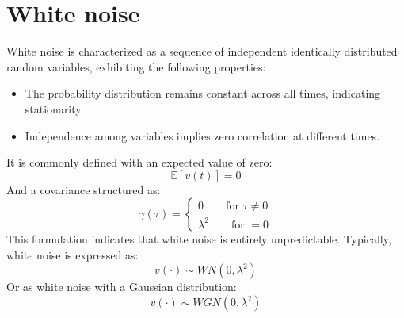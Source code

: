 \section{White noise}

White noise is characterized as a sequence of independent identically distributed random variables, exhibiting the following properties:
\begin{itemize}
    \item The probability distribution remains constant across all times, indicating stationarity.
    \item  Independence among variables implies zero correlation at different times.
\end{itemize}
It is commonly defined with an expected value of zero:
\[\mathbb{E}\left[v(t)\right]=0\]
And a covariance structured as:
\[\gamma(\tau)=
\begin{cases}
    0 \qquad \text{for } \tau \neq 0 \\
    \lambda^2 \qquad \text{for } = 0
\end{cases}\]
This formulation indicates that white noise is entirely unpredictable. 
Typically, white noise is expressed as:
\[v(\cdot) \sim WN(0,\lambda^2)\]
Or as white noise with a Gaussian distribution:
\[v(\cdot) \sim WGN(0,\lambda^2)\]
